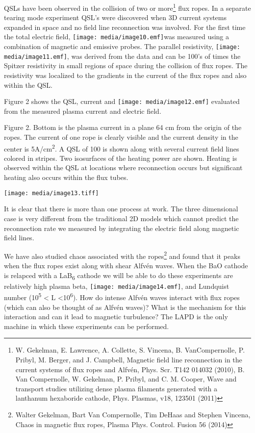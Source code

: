 \documentclass[11pt]{article}
\begin{document}
\begin{description}
QSLs have been observed in the collision of two or more\footnote{W.
  Gekelman, E. Lawrence, A. Collette, S. Vincena, B. VanCompernolle, P.
  Pribyl, M. Berger, and J. Campbell, Magnetic field line reconnection
  in the current systems of flux ropes and Alfvén, Phys. Scr. T142
  014032 (2010), B. Van Compernolle, W. Gekelman, P. Pribyl, and C. M.
  Cooper, Wave and transport studies utilizing dense plasma filaments
  generated with a lanthanum hexaboride cathode, Phys. Plasmas, v18,
  123501 (2011)} flux ropes. In a separate tearing mode experiment QSL's
were discovered when 3D current systems expanded in space and no field
line reconnection was involved. For the first time the total electric
field, \texttt{[image: media/image10.emf]}was measured using a
combination of magnetic and emissive probes. The parallel resistivity,
\texttt{[image: media/image11.emf]}, was derived from the data and can
be 100's of times the Spitzer resistivity in small regions of space
during the collision of flux ropes. The resistivity was localized to the
gradients in the current of the flux ropes and also within the QSL.

Figure 2 shows the QSL, current and \texttt{[image: media/image12.emf]}
evaluated from the measured plasma current and electric field.

Figure 2. Bottom is the plasma current in a plane 64 cm from the origin
of the ropes. The current of one rope is clearly visible and the current
density in the center is 5A/cm\textsuperscript{2}. A QSL of 100 is shown
along with several current field lines colored in stripes. Two
isosurfaces of the heating power are shown. Heating is observed within
the QSL at locations where reconnection occurs but significant heating
also occurs within the flux tubes.

\texttt{[image: media/image13.tiff]}

It is clear that there is more than one process at work. The three
dimensional case is very different from the traditional 2D models which
cannot predict the reconnection rate we measured by integrating the
electric field along magnetic field lines.

We have also studied chaos associated with the ropes\footnote{Walter
  Gekelman, Bart Van Compernolle, Tim DeHaas and Stephen Vincena, Chaos
  in magnetic flux ropes, Plasma Phys. Control. Fusion 56 (2014)} and
found that it peaks when the flux ropes exist along with shear Alfvén
waves. When the BaO cathode is relapced with a LaB\textsubscript{6}
cathode we will be able to do these experiments are relatively high
plasma beta, \texttt{[image: media/image14.emf]}, and Lundquist number
(10\textsuperscript{5} \textless{} L \textless{}10\textsuperscript{6}).
How do intense Alfvén waves interact with flux ropes (which can also be
thought of as Alfvén waves)? What is the mechanism for this interaction
and can it lead to magnetic turbulence? The LAPD is the only machine in
which these experiments can be performed.


\end{description}
\end{document}
